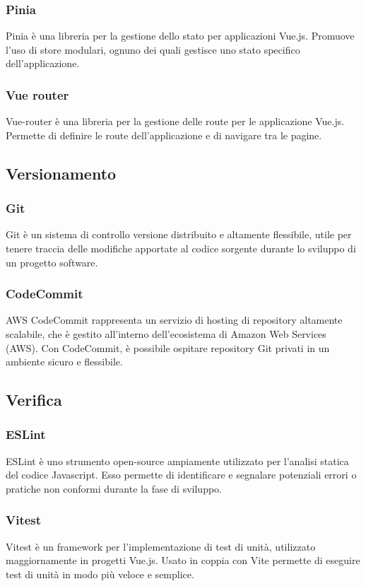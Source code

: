  \subsubsection{Pinia}\label{subsubsec:pinia}
Pinia è una libreria per la gestione dello stato per applicazioni Vue.js. Promuove l'uso di store modulari, ognuno dei quali gestisce uno stato specifico dell'applicazione.
\subsubsection{Vue router}\label{subsubsec:vue-router}
Vue-router è una libreria per la gestione delle route per le applicazione Vue.js. Permette di definire le route dell'applicazione e di navigare tra le pagine.

\subsection{Versionamento}\label{subsec:versionamento}
\subsubsection{Git}\label{subsubsec:git}
Git è un sistema di controllo versione distribuito e altamente flessibile, utile per tenere traccia delle modifiche apportate al codice sorgente durante lo sviluppo di un progetto software.
\subsubsection{CodeCommit}\label{subsubsec:CodeCommit}
AWS CodeCommit rappresenta un servizio di hosting di repository altamente scalabile, che è gestito all'interno dell'ecosistema di Amazon Web Services (AWS). 
Con CodeCommit, è possibile ospitare repository Git privati in un ambiente sicuro e flessibile.

\subsection{Verifica}\label{subsec:verifica}
\subsubsection{ESLint}\label{subsubsec:eslint}
ESLint è uno strumento open-source ampiamente utilizzato per l'analisi statica del codice Javascript. Esso permette di identificare e segnalare potenziali errori o pratiche non conformi durante la fase di sviluppo.
\subsubsection{Vitest}\label{subsubsec:vitest}
Vitest è un framework per l'implementazione di test di unità, utilizzato maggiornamente in progetti Vue.js.
Usato in coppia con Vite permette di eseguire test di unità in modo più veloce e semplice.

